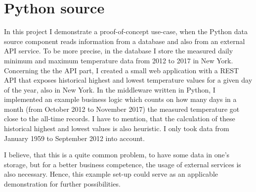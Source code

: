 \section{Python source} \label{case-study-python-source}

In this project I demonstrate a proof-of-concept use-case, when the Python data source component reads information from a database and also from an external API service. To be more precise, in the database I store the measured daily minimum and maximum temperature data from 2012 to 2017 in New York. Concerning the the API part, I created a small web application with a REST API that exposes historical highest and lowest temperature values for a given day of the year, also in New York. In the middleware written in Python, I implemented an example business logic which counts on how many days in a month (from October 2012 to November 2017) the measured temperature got close to the all-time records. I have to mention, that the calculation of these historical highest and lowest values is also heuristic. I only took data from January 1959 to September 2012 into account.

I believe, that this is a quite common problem, to have some data in one's storage, but for a better business competence, the usage of external services is also necessary. Hence, this example set-up could serve as an applicable demonstration for further possibilities.